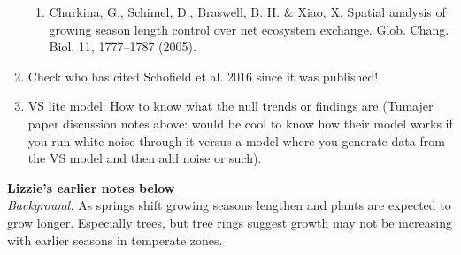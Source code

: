 \documentclass[11pt,letter]{article}
\begin{document}
\begin{enumerate}
\begin{enumerate}
\item Churkina, G., Schimel, D., Braswell, B. H. \& Xiao, X. Spatial analysis of growing season length control over net ecosystem exchange. Glob. Chang. Biol. 11, 1777–1787 (2005).
\end{enumerate}
\item Check who has cited Schofield et al. 2016 since it was published!
\item VS lite model: How to know what the null trends or findings are (Tumajer paper discussion notes above: would be cool to know how their model works if you run white noise through it versus a model where you generate data from the VS model and then add noise or such). 
\end{enumerate}


\newpage
{\bf Lizzie's earlier notes below}\\

\emph{Background:} As springs shift growing seasons lengthen and plants are expected to grow longer. Especially trees, but tree rings suggest growth may not be increasing with earlier seasons in temperate zones. \\
\end{document}
